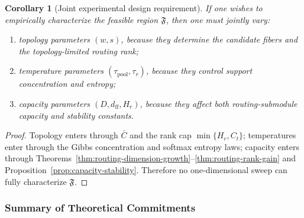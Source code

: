 \documentclass{article}
\theoremstyle{plain}
\newtheorem{corollary}[theorem]{Corollary}
\theoremstyle{definition}
\theoremstyle{remark}
\begin{document}
\begin{corollary}[Joint experimental design requirement]
\label{cor:joint-experimental-design}
If one wishes to empirically characterize the feasible region $\mathfrak{F}$, then one must jointly vary:
\begin{enumerate}
    \item topology parameters $(w,s)$, because they determine the candidate fibers and the topology-limited routing rank;
    \item temperature parameters $(\tau_{\mathrm{pool}},\tau_r)$, because they control support concentration and entropy;
    \item capacity parameters $(D,d_{\mathrm{ff}},H_r)$, because they affect both routing-submodule capacity and stability constants.
\end{enumerate}
\end{corollary}

\begin{proof}
Topology enters through $\bar C$ and the rank cap $\min\{H_r,C_{t}\}$; temperatures enter through the Gibbs concentration and softmax entropy laws; capacity enters through Theorems~\ref{thm:routing-dimension-growth}--\ref{thm:routing-rank-gain} and Proposition~\ref{prop:capacity-stability}. Therefore no one-dimensional sweep can fully characterize $\mathfrak{F}$.
\end{proof}

\subsubsection{Summary of Theoretical Commitments}
\label{sec:tier-c-summary}
\end{document}
